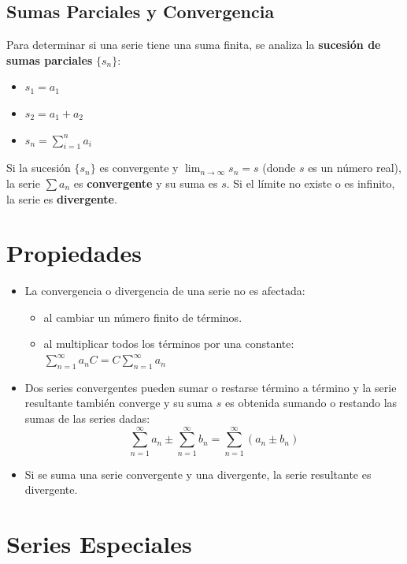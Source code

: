 \documentclass[a4paper,12pt]{article}
\begin{document}
\subsection{Sumas Parciales y Convergencia}
Para determinar si una serie tiene una suma finita, se analiza la \textbf{sucesión de sumas parciales} $\{s_n\}$:
\begin{itemize}
    \item $s_1 = a_1$
    \item $s_2 = a_1 + a_2$
    \item $s_n = \sum_{i=1}^{n} a_i$
\end{itemize}

\begin{tcolorbox}[title=Definición de Convergencia,colback=blue!5!white,colframe=blue!75!black]
Si la sucesión $\{s_n\}$ es convergente y $\lim_{n \to \infty} s_n = s$ (donde $s$ es un número real), la serie $\sum a_n$ es \textbf{convergente} y su suma es $s$. Si el límite no existe o es infinito, la serie es \textbf{divergente}.
\end{tcolorbox}

\section{Propiedades}
\begin{itemize}
    \item La convergencia o divergencia de una serie no es afectada:
    \begin{itemize}
        \item al cambiar un número finito de términos.
        \item al multiplicar todos los términos por una constante: $\sum_{n=1}^{\infty} a_n  C = C \sum_{n=1}^{\infty} a_n$
    \end{itemize} 
    \item Dos series convergentes pueden sumar o restarse término a término y la serie resultante también converge y su suma $s$ es obtenida sumando o restando las sumas de las series dadas:
    $$\sum_{n=1}^{\infty} a_n \pm \sum_{n=1}^{\infty} b_n = \sum_{n=1}^{\infty} (a_n \pm b_n)$$
    \item Si se suma una serie convergente y una divergente, la serie resultante es divergente.
\end{itemize}

\section{Series Especiales}
\end{document}
